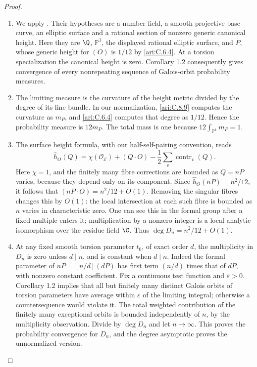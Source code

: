 \begin{proof}
\begin{enumerate}[label=\arabic*.,leftmargin=*]
\item We apply \citet[Theorem~1.1 and Corollary~1.2, arXiv v2, p.~2]{demarco2017}.
Their hypotheses are a number field, a smooth projective
base curve, an elliptic surface and a rational section of
nonzero generic canonical height. Here they are $\Q$,
$\mathbb P^1$, the displayed rational elliptic surface,
and $P$, whose generic height for $(O)$ is $1/12$ by \ref{ari:C.6.4}.
At a torsion specialization the canonical height is zero.
Corollary 1.2 consequently gives convergence of every
nonrepeating sequence of Galois-orbit probability measures.

\item The limiting measure is the curvature of the height metric
divided by the degree of its line bundle. In our normalization,
\ref{ari:C.8.9} computes the curvature as $m_P$, and \ref{ari:C.6.4} computes
that degree as $1/12$. Hence the probability measure is
$12m_P$. The total mass is one because
$12\int_{\mathbb P^1}m_P=1$.

\item The surface height
formula, with our half-self-pairing convention, reads
\[
 \widehat h_O(Q)=\chi(\mathcal O_{\mathcal E})+(Q\cdot O)
                -\frac12\sum_v\operatorname{contr}_v(Q).
\]
Here $\chi=1$, and the finitely many fibre corrections are
bounded as $Q=nP$ varies, because they depend only on its
component. Since $\widehat h_O(nP)=n^2/12$, it follows
that $(nP\cdot O)=n^2/12+O(1)$. Removing the singular fibres
changes this by $O(1)$: the local intersection at each
such fibre is bounded as $n$ varies in characteristic zero.
One can see this in the formal group after a fixed
multiple enters it; multiplication by a nonzero integer
is a local analytic isomorphism over the residue field
$\C$. Thus $\deg D_n=n^2/12+O(1)$.

\item At any fixed smooth torsion parameter $t_0$, of exact order
$d$, the multiplicity in $D_n$ is zero unless $d\mid n$,
and is constant when $d\mid n$. Indeed the formal parameter
of $nP=[n/d](dP)$ has first term $(n/d)$ times that of $dP$,
with nonzero constant coefficient. Fix a continuous test
function and $\varepsilon>0$. Corollary 1.2 implies that
all but finitely many distinct Galois orbits of torsion
parameters have average within $\varepsilon$ of the limiting
integral; otherwise a countersequence would violate it.
The total weighted contribution of the finitely many
exceptional orbits is bounded independently of $n$, by
the multiplicity observation. Divide by $\deg D_n$ and
let $n\to\infty$. This proves the probability convergence
for $D_n$, and the degree asymptotic proves the unnormalized
version.
\end{enumerate}
\end{proof}